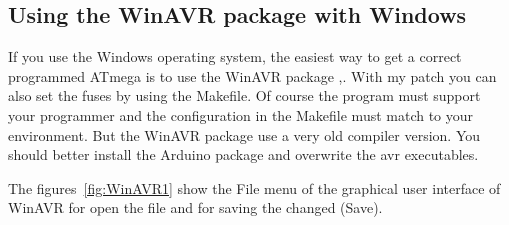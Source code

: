 \subsection{Using the WinAVR package with Windows}
If you use the Windows operating system, the easiest way to get a correct programmed
ATmega is to use the WinAVR package \cite{winavr1},\cite{winavr2}.
With my patch \cite{winavr3} you can also set the fuses by using the Makefile.
Of course the  program must support your programmer and the configuration
in the Makefile must match to your environment.
But the WinAVR package use a very old compiler version. You should better install
the Arduino package and overwrite the avr executables.

The figures~\ref{fig:WinAVR1} show the File menu of the graphical user interface of WinAVR for
open the file  and for saving the changed  (Save).

